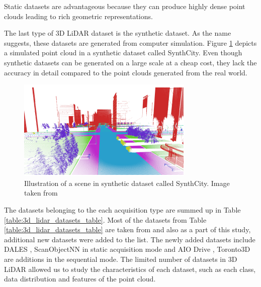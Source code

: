     Static datasets are advantageous because they can produce highly dense point clouds leading to rich geometric representations.
    
    The last type of 3D LiDAR dataset is the synthetic dataset. 
    As the name suggests, these datasets are generated from computer simulation. 
    Figure \ref{fig:synthetic} depicts a simulated point cloud in a synthetic dataset called SynthCity.
    Even though synthetic datasets can be generated on a large scale at a cheap cost, they lack the accuracy in detail compared to the point clouds generated from the real world.
    \begin{figure}[h!]
        \centering
        \includegraphics[scale=0.5]{images/synthcity.png}
        \caption{Illustration of a scene in synthetic dataset called SynthCity. Image taken from \cite{griffiths2019synthcity}}
        \label{fig:synthetic}
    \end{figure}
    
    The datasets belonging to the each acquisition type are summed up in  Table \ref{table:3d_lidar_datasets_table}.
    Most of the datasets from Table \ref{table:3d_lidar_datasets_table} are taken from \cite{survey3d} and also as a part of this study, additional new datasets were added to the list.
    The newly added datasets include DALES \cite{varney2020dales}, ScanObjectNN \cite{scanobejctnn} in static acquisition mode and AIO Drive \cite{Weng2020_AIODrive}, Toronto3D \cite{tan2020toronto3d} are additions in the sequential mode.
    The limited number of datasets in 3D LiDAR allowed us to study the characteristics of each dataset, such as each class, data distribution and features of the point cloud. 
    
